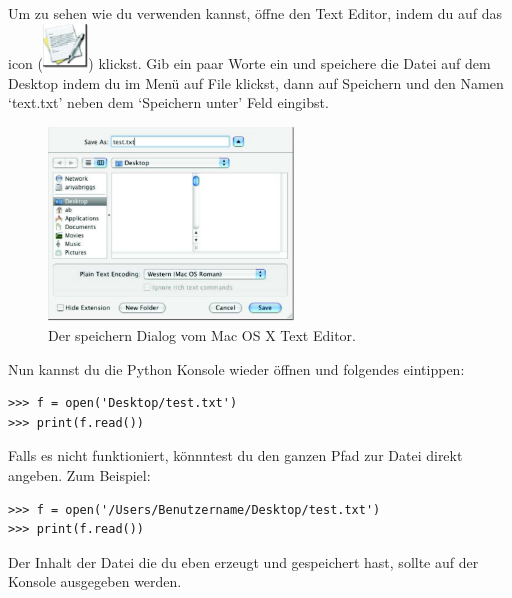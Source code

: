 \begin{MAC}
Um zu sehen wie du  verwenden kannst, öffne den Text Editor, indem du auf das icon (\includegraphics*[width=12mm]{images/textedit-icon}) klickst. Gib ein paar Worte ein und speichere die Datei auf dem Desktop indem du im Menü auf File klickst, dann auf Speichern und den Namen `text.txt'  neben dem `Speichern unter' Feld eingibst.

\begin{figure}
\begin{center}
\includegraphics[width=65mm]{images/figure18}
\end{center}
\caption{Der speichern Dialog vom Mac OS X Text Editor.}\label{fig18}
\end{figure}

Nun kannst du die Python Konsole wieder öffnen und folgendes eintippen:

\begin{Verbatim}[frame=single]
>>> f = open('Desktop/test.txt')
>>> print(f.read())
\end{Verbatim}

Falls es nicht funktioniert, könnntest du den ganzen Pfad zur Datei direkt angeben. Zum Beispiel:

\begin{Verbatim}[frame=single]
>>> f = open('/Users/Benutzername/Desktop/test.txt')
>>> print(f.read())
\end{Verbatim}

Der Inhalt der Datei die du eben erzeugt und gespeichert hast, sollte auf der Konsole ausgegeben werden. %
\end{MAC}

